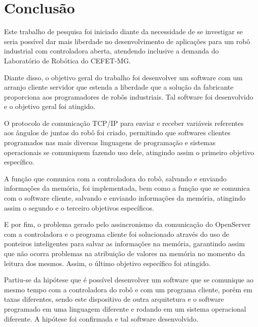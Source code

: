 \chapter{Conclusão}
    \label{chp:Conclusão}

    Este trabalho de pesquisa foi iniciado diante da necessidade de se investigar se seria possível dar mais liberdade no desenvolvimento de aplicações para um robô industrial com controladora aberta, atendendo inclusive a demanda do Laboratório de Robótica do CEFET-MG.
    
    Diante disso, o objetivo geral do trabalho foi desenvolver um software com um arranjo cliente servidor que estenda a liberdade que a solução da fabricante proporciona aos programadores de robôs industriais. Tal software foi desenvolvido e o objetivo geral foi atingido.
    
    O protocolo de comunicação TCP/IP para enviar e receber variáveis referentes aos ângulos de juntas do robô foi criado, permitindo que softwares clientes programados nas mais diversas linguagens de programação e sistemas operacionais se comuniquem fazendo uso dele, atingindo assim o primeiro objetivo específico.
    
    A função que comunica com a controladora do robô, salvando e enviando informações da memória, foi implementada, bem como a função que se comunica com o software cliente, salvando e enviando informações da memória, atingindo assim o segundo e o terceiro objetivos específicos.

    E por fim, o problema gerado pelo assincronismo da comunicação do OpenServer com a controladora e o programa cliente foi solucionado através do uso de ponteiros inteligentes para salvar as informações na memória, garantindo assim que não ocorra problemas na atribuição de valores na memória no momento da leitura dos mesmos. Assim, o último objetivo específico foi atingido.
        
    
    Partiu-se da hipótese que é possível desenvolver um software que se comunique ao mesmo tempo com a controladora do robô e com um programa cliente, porém em taxas diferentes, sendo este dispositivo de outra arquitetura e o software programado em uma linguagem diferente e rodando em um sistema operacional diferente. A hipótese foi confirmada e tal software desenvolvido.
    
